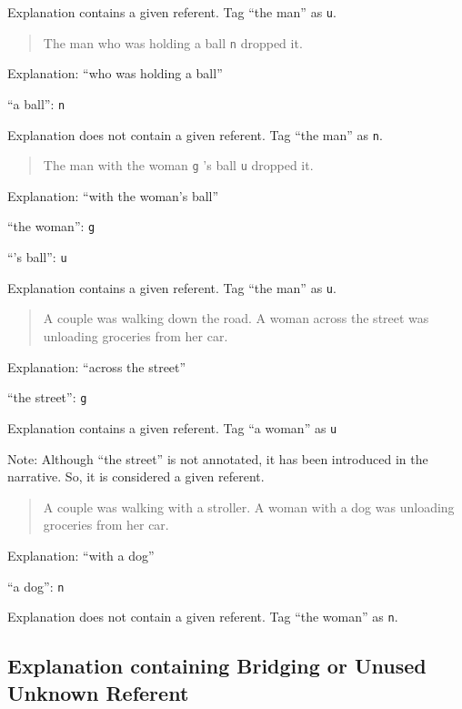 \documentclass[
]{book}
\begin{document}
Explanation contains a given referent.
Tag ``the man'' as \texttt{u}.

\begin{quote}
The man who was holding a ball \texttt{n} dropped it.
\end{quote}

Explanation: ``who was holding a ball''

``a ball'': \texttt{n}

Explanation does not contain a given referent.
Tag ``the man'' as \texttt{n}.

\begin{quote}
The man with the woman \texttt{g} 's ball \texttt{u} dropped it.
\end{quote}

Explanation: ``with the woman's ball''

``the woman'': \texttt{g}

``'s ball'': \texttt{u}

Explanation contains a given referent.
Tag ``the man'' as \texttt{u}.

\begin{quote}
A couple was walking down the road.
A woman across the street was unloading groceries from her car.
\end{quote}

Explanation: ``across the street''

``the street'': \texttt{g}

Explanation contains a given referent.
Tag ``a woman'' as \texttt{u}

Note: Although ``the street'' is not annotated, it has been introduced in the narrative.
So, it is considered a given referent.

\begin{quote}
A couple was walking with a stroller.
A woman with a dog was unloading groceries from her car.
\end{quote}

Explanation: ``with a dog''

``a dog'': \texttt{n}

Explanation does not contain a given referent.
Tag ``the woman'' as \texttt{n}.

\hypertarget{explanation-containing-bridging-or-unused-unknown-referent}{%
\subsection{Explanation containing Bridging or Unused Unknown Referent}\label{explanation-containing-bridging-or-unused-unknown-referent}}
\end{document}
